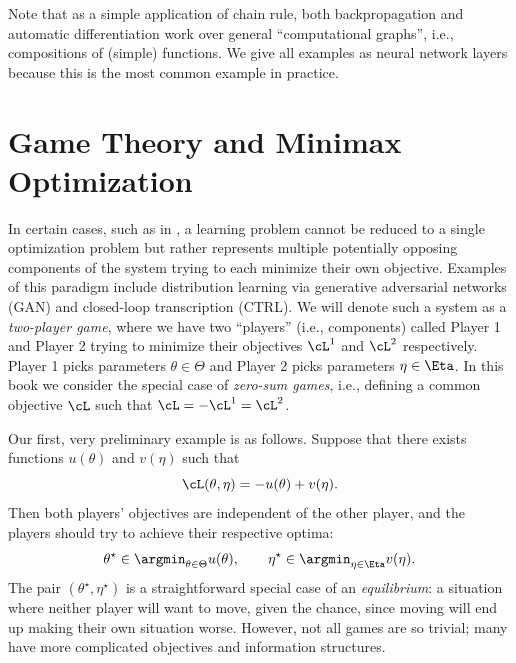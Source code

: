 \documentclass[../../book-main.tex]{subfiles}
\begin{document}
Note that as a simple application of chain rule, both backpropagation
and automatic differentiation work over general ``computational
graphs'', i.e., compositions of (simple) functions. We give all
examples as neural network layers because this is the most common
example in practice.

\section{Game Theory and Minimax Optimization}
\label{sec:minimax}\label{sec:game_theory}

In certain cases, such as in , a learning
problem cannot be reduced to a single optimization problem but rather
represents multiple potentially opposing components of the system trying
to each minimize their own objective. Examples of this paradigm
include distribution learning via generative adversarial networks
(GAN) and closed-loop transcription (CTRL). We will denote such a
system as a \textit{two-player game}, where we have two ``players''
(i.e., components) called Player 1 and Player 2 trying to minimize
their objectives \(\cL^{1}\) and \(\cL^{2}\) respectively. Player 1
picks parameters \(\theta \in \Theta\) and Player 2 picks parameters
\(\eta \in \Eta\). In this book we consider the special case of
\textit{zero-sum games}, i.e., defining a common objective \(\cL\)
such that \(\cL = -\cL^{1} = \cL^{2}\).

Our first, very preliminary example is as follows. Suppose that there
exists functions \(u(\theta)\) and \(v(\eta)\) such that
\begin{equation}
    \cL(\theta, \eta) = -u(\theta) + v(\eta).
\end{equation}
Then both players' objectives are independent of the other player,
and the players should try to achieve their respective optima:
\begin{equation}
    \theta^{\star} \in \argmin_{\theta \in \Theta}u(\theta), \qquad
    \eta^{\star} \in \argmin_{\eta \in \Eta}v(\eta).
\end{equation}
The pair \((\theta^{\star}, \eta^{\star})\) is a straightforward
special case of an \textit{equilibrium}: a situation where neither
player will want to move, given the chance, since moving will end up
making their own situation worse. However, not all games are so
trivial; many have more complicated objectives and information structures.
\end{document}
